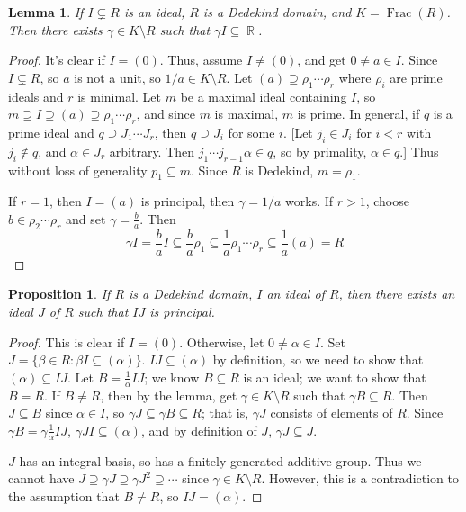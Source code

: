 \documentclass[11pt, a4paper]{memoir}
\DeclareMathOperator{\R}{{\mathbb{R}}}
\theoremstyle{change}
\newtheorem{lemma}[theorem]{Lemma}
\newtheorem{proposition}[theorem]{Proposition}
\theoremstyle{plain}
\theoremstyle{nonumberplain}
\newtheorem{proof}{Proof}
\DeclareMathOperator{\Frac}{Frac}
\begin{document}
\begin{lemma}
    If $I\subsetneq R$ is an ideal, $R$ is a Dedekind domain, and $K=\Frac(R)$.
    Then there exists $\gamma\in K\setminus R$ such that $\gamma I\subseteq\R$.
\end{lemma}
\begin{proof}
    It's clear if $I=(0)$.
    Thus, assume $I\neq (0)$, and get $0\neq a\in I$.
    Since $I\subsetneq R$, so $a$ is not a unit, so $1/a\in K\setminus R$.
    Let $(a)\supseteq\rho_1\cdots\rho_r$ where $\rho_i$ are prime ideals and $r$ is minimal.
    Let $m$ be a maximal ideal containing $I$, so $m\supseteq I\supseteq(a)\supseteq\rho_1\cdots\rho_r$, and since $m$ is maximal, $m$ is prime.
    In general, if $q$ is a prime ideal and $q\supseteq J_1\cdots J_r$, then $q\supseteq J_i$ for some $i$.
    [Let $j_i\in J_i$ for $i<r$ with $j_i\notin q$, and $\alpha\in J_r$ arbitrary.
    Then $j_1\cdots j_{r-1}\alpha\in q$, so by primality, $\alpha\in q$.]
    Thus without loss of generality $p_1\subseteq m$.
    Since $R$ is Dedekind, $m=\rho_1$.

    If $r=1$, then $I=(a)$ is principal, then $\gamma=1/a$ works.
    If $r>1$, choose $b\in\rho_2\cdots\rho_r$ and set $\gamma=\frac{b}{a}$.
    Then
    \begin{equation*}
        \gamma I=\frac{b}{a}I\subseteq\frac{b}{a}\rho_1\subseteq\frac{1}{a}\rho_1\cdots\rho_r\subseteq\frac{1}{a}(a)=R
    \end{equation*}
\end{proof}
\begin{proposition}
    If $R$ is a Dedekind domain, $I$ an ideal of $R$, then there exists an ideal $J$ of $R$ such that $IJ$ is principal.
\end{proposition}
\begin{proof}
    This is clear if $I=(0)$.
    Otherwise, let $0\neq\alpha\in I$.
    Set $J=\{\beta\in R:\beta I\subseteq(\alpha)\}$.
    $IJ\subseteq(\alpha)$ by definition, so we need to show that $(\alpha)\subseteq IJ$.
    Let $B=\frac{1}{\alpha}IJ$; we know $B\subseteq R$ is an ideal; we want to show that $B=R$.
    If $B\neq R$, then by the lemma, get $\gamma\in K\setminus R$ such that $\gamma B\subseteq R$.
    Then $J\subseteq B$ since $\alpha\in I$, so $\gamma J\subseteq\gamma B\subseteq R$; that is, $\gamma J$ consists of elements of $R$.
    Since $\gamma B=\gamma\frac{1}{\alpha} IJ$, $\gamma JI\subseteq(\alpha)$, and by definition of $J$, $\gamma J\subseteq J$.

    $J$ has an integral basis, so has a finitely generated additive group.
    Thus we cannot have $J\supseteq\gamma J\supseteq\gamma J^2\supseteq\cdots$ since $\gamma\in K\setminus R$.
    However, this is a contradiction to the assumption that $B\neq R$, so $IJ=(\alpha)$.
\end{proof}
\end{document}
